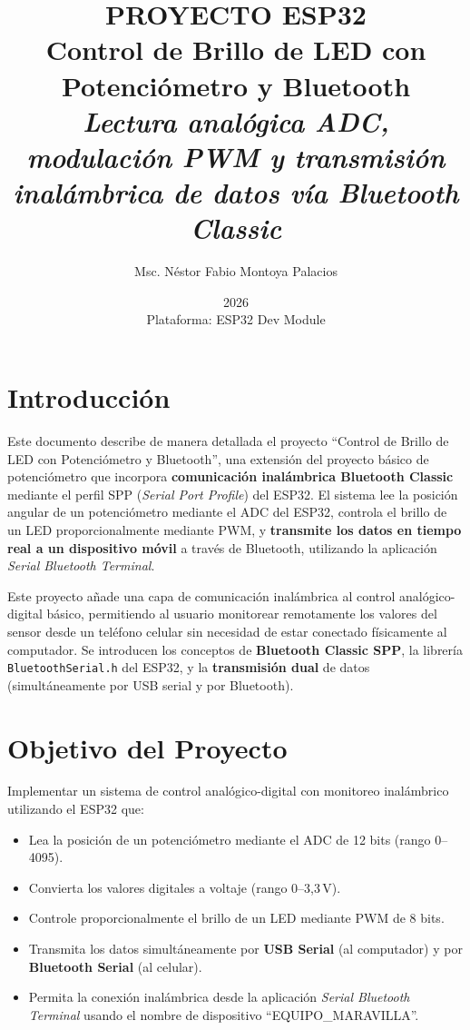 \documentclass[12pt,a4paper]{article}
\title{\Huge\textbf{PROYECTO ESP32} \\ \Large Control de Brillo de LED con Potenciómetro y Bluetooth \\ \vspace{0.5cm} \normalsize \textit{Lectura analógica ADC, modulación PWM y transmisión inalámbrica de datos vía Bluetooth Classic}}
\author{Msc. Néstor Fabio Montoya Palacios}
\date{2026 \\ \vspace{0.2cm} \small Plataforma: ESP32 Dev Module}
\begin{document}
\maketitle
\tableofcontents
\newpage

\section{Introducción}

Este documento describe de manera detallada el proyecto ``Control de Brillo de LED con Potenciómetro y Bluetooth'', una extensión del proyecto básico de potenciómetro que incorpora \textbf{comunicación inalámbrica Bluetooth Classic} mediante el perfil SPP (\textit{Serial Port Profile}) del ESP32. El sistema lee la posición angular de un potenciómetro mediante el ADC del ESP32, controla el brillo de un LED proporcionalmente mediante PWM, y \textbf{transmite los datos en tiempo real a un dispositivo móvil} a través de Bluetooth, utilizando la aplicación \textit{Serial Bluetooth Terminal}.

Este proyecto añade una capa de comunicación inalámbrica al control analógico-digital básico, permitiendo al usuario monitorear remotamente los valores del sensor desde un teléfono celular sin necesidad de estar conectado físicamente al computador. Se introducen los conceptos de \textbf{Bluetooth Classic SPP}, la librería \texttt{BluetoothSerial.h} del ESP32, y la \textbf{transmisión dual} de datos (simultáneamente por USB serial y por Bluetooth).

\section{Objetivo del Proyecto}

Implementar un sistema de control analógico-digital con monitoreo inalámbrico utilizando el ESP32 que:
\begin{itemize}
    \item Lea la posición de un potenciómetro mediante el ADC de 12 bits (rango 0--4095).
    \item Convierta los valores digitales a voltaje (rango 0--3,3\,V).
    \item Controle proporcionalmente el brillo de un LED mediante PWM de 8 bits.
    \item Transmita los datos simultáneamente por \textbf{USB Serial} (al computador) y por \textbf{Bluetooth Serial} (al celular).
    \item Permita la conexión inalámbrica desde la aplicación \textit{Serial Bluetooth Terminal} usando el nombre de dispositivo ``EQUIPO\_MARAVILLA''.
\end{itemize}
\end{document}
